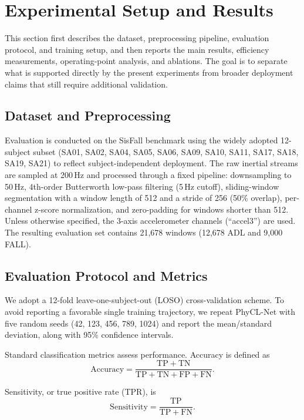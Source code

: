\documentclass[jec]{acnsart}
\begin{document}
\section{Experimental Setup and Results}

This section first describes the dataset, preprocessing pipeline, evaluation protocol, and training setup, and then reports the main results, efficiency measurements, operating-point analysis, and ablations. The goal is to separate what is supported directly by the present experiments from broader deployment claims that still require additional validation.

\subsection{Dataset and Preprocessing}

Evaluation is conducted on the SisFall benchmark using the widely adopted 12-subject subset (SA01, SA02, SA04, SA05, SA06, SA09, SA10, SA11, SA17, SA18, SA19, SA21) to reflect subject-independent deployment. The raw inertial streams are sampled at 200\,Hz and processed through a fixed pipeline: downsampling to 50\,Hz, 4th-order Butterworth low-pass filtering (5\,Hz cutoff), sliding-window segmentation with a window length of 512 and a stride of 256 (50\% overlap), per-channel z-score normalization, and zero-padding for windows shorter than 512. Unless otherwise specified, the 3-axis accelerometer channels (``accel3'') are used. The resulting evaluation set contains 21,678 windows (12,678 ADL and 9,000 FALL).

\subsection{Evaluation Protocol and Metrics}

We adopt a 12-fold leave-one-subject-out (LOSO) cross-validation scheme. To avoid reporting a favorable single training trajectory, we repeat PhyCL-Net with five random seeds (42, 123, 456, 789, 1024) and report the mean/standard deviation, along with 95\% confidence intervals.

Standard classification metrics assess performance. Accuracy is defined as
\begin{equation}
\label{eq:accuracy}
\mathrm{Accuracy} = \frac{\mathrm{TP} + \mathrm{TN}}{\mathrm{TP} + \mathrm{TN} + \mathrm{FP} + \mathrm{FN}}.
\end{equation}

Sensitivity, or true positive rate (TPR), is
\begin{equation}
\label{eq:sensitivity}
\mathrm{Sensitivity} = \frac{\mathrm{TP}}{\mathrm{TP} + \mathrm{FN}}.
\end{equation}
\end{document}
